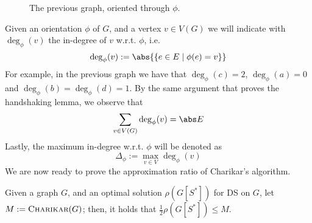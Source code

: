 \documentclass[a4paper, 12pt]{report}
\begin{document}
    \begin{figure}[H]
        \centering
        \caption{The previous graph, oriented through $\phi$.}
        \label{oriented graph}
    \end{figure}

    Given an orientation $\phi$ of $G$, and a vertex $v \in V(G)$ we will indicate with $\deg_\phi(v)$ the in-degree of $v$ w.r.t. $\phi$, i.e. $$\deg_\phi(v) := \abs{\{e \in E \mid \phi(e) = v\}}$$ For example, in the previous graph we have that $\deg_\phi(c) = 2$, $\deg_\phi(a) = 0$ and $\deg_\phi(b) = \deg_\phi(d) = 1$. By the same argument that proves the handshaking lemma, we observe that $$\sum_{v \in V(G)}{\deg_\phi(v)} = \abs E$$ Lastly, the maximum in-degree w.r.t. $\phi$ will be denoted as $$\Delta_\phi := \max_{v \in V} {\deg_\phi(v)}$$ We are now ready to prove the approximation ratio of Charikar's algorithm.

    \begin{framedthm}[label={charikar approx}]{}
        Given a graph $G$, and an optimal solution $\rho(G[S^*])$ for DS on $G$, let $M := \textsc{Charikar}(G)$; then, it holds that $\tfrac{1}{2} \rho(G[S^*]) \le M$.
    \end{framedthm}
\end{document}
